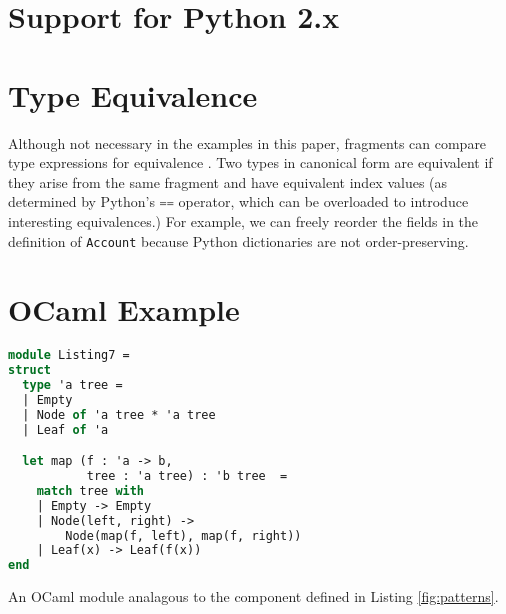 \documentclass[preprint,10pt]{sigplanconf}
\newcommand{\lip}[1]{\lstinline[language=Python,basicstyle=\ttfamily\footnotesize,deletendkeywords={tuple,buffer,map}]{#1}}
\begin{document}
\clearpage
\appendix
\section{Support for Python 2.x}\label{sec:python2-support}

\section{Type Equivalence}\label{sec:type-equality}
Although not necessary in the examples in this paper, fragments can compare type expressions for equivalence \cite{StoneHarper00}. Two types in canonical form are equivalent if they arise from the same fragment and have equivalent index values (as determined by Python's \lip{==} operator, which can be overloaded to introduce interesting equivalences.) For example,  we can freely reorder the fields in the definition of \lip{Account} because Python dictionaries are not order-preserving.

\section{OCaml Example}\label{sec:ocaml-examples}
\begin{codelisting}[h!]
\vspace{-3px}
\begin{lstlisting}[language=ML, morekeywords={module,match}]
module Listing7 = 
struct
  type 'a tree = 
  | Empty
  | Node of 'a tree * 'a tree
  | Leaf of 'a

  let map (f : 'a -> b, 
           tree : 'a tree) : 'b tree  =
    match tree with 
    | Empty -> Empty
    | Node(left, right) -> 
        Node(map(f, left), map(f, right))
    | Leaf(x) -> Leaf(f(x))
end
\end{lstlisting}
\caption{An OCaml module analagous to the component defined in Listing \ref{fig:patterns}.}
\label{fig:ocaml-example-1}
\end{codelisting}
\end{document}
